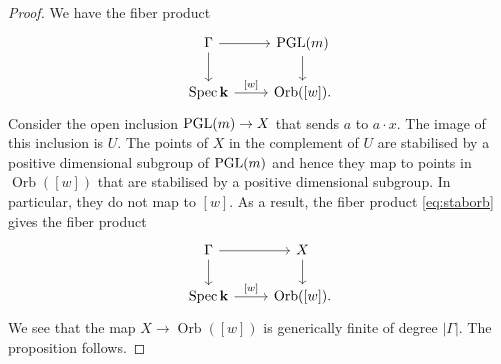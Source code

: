 \documentclass{amsart}
\renewcommand{\k}{\mathbf k}
\DeclareMathOperator{\Orb}{Orb}
\begin{document}
\begin{proof}
  We have the fiber product
\begin{equation}\label{eq:staborb}
    \begin{tikzcd}
      \Gamma \ar{r}\ar{d} & \PGL(m)\ar{d} \\
      \spec \k \ar{r}{[w]} & \Orb([w]).
    \end{tikzcd}
  \end{equation}
  Consider the open inclusion \(\operatorname{PGL}(m) \to X\) that sends \(a\) to \(a \cdot x\).
  The image of this inclusion is \(U\).
  The points of \(X\) in the complement of \(U\) are stabilised by a positive dimensional subgroup of \(\operatorname{PGL}(m)\) and hence they map to points in \(\Orb([w])\) that are stabilised by a positive dimensional subgroup.
  In particular, they do not map to \([w]\).
  As a result, the fiber product \eqref{eq:staborb} gives the fiber product
    \[
    \begin{tikzcd}
      \Gamma \ar{r}\ar{d} & X \ar{d} \\
      \spec \k \ar{r}{[w]} & \Orb([w]).
    \end{tikzcd}
  \]
  We see that the map \(X \to \Orb([w])\) is generically finite of degree \(|\Gamma|\).
  The proposition follows.
\end{proof}
\end{document}
